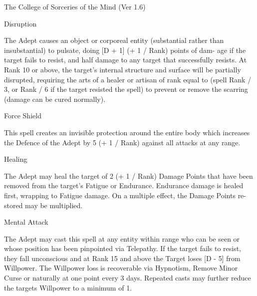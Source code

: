 \begin{Chapter}{The College of Sorceries of the Mind (Ver 1.6)}
\begin{spell}[S-1]{Disruption}

\begin{effects}
The Adept causes an object or corporeal entity (substantial rather
than insubstantial) to pulsate, doing [D + 1] (+ 1 / Rank) points of
dam- age if the target fails to resist, and half damage to any target
that successfully resists.  At Rank 10 or above, the target’s internal
structure and surface will be partially disrupted, requiring the arts
of a healer or artisan of rank equal to (spell Rank / 3, or Rank / 6
if the target resisted the spell) to prevent or remove the scarring
(damage can be cured normally).
\end{effects}
\end{spell}

\begin{spell}[S-2]{Force Shield}

\begin{effects}
This spell creates an invisible protection around the entire body
which increases the Defence of the Adept by 5 (+ 1 / Rank) against all
attacks at any range.
\end{effects}
\end{spell}

\begin{spell}[S-3]{Healing}

\begin{effects}
The Adept may heal the target of 2 (+ 1 / Rank) Damage Points that
have been removed from the target’s Fatigue or Endurance. Endurance
damage is healed first, wrapping to Fatigue damage.  On a multiple
effect, the Damage Points re- stored may be multiplied.
\end{effects}
\end{spell}

\begin{spell}[S-4]{Mental Attack}

\begin{effects}
The Adept may cast this spell at any entity within range who can be
seen or whose position has been pinpointed via Telepathy.  If the
target fails to resist, they fall unconscious and at Rank 15 and above
the Target loses [D - 5] from Willpower.  The Willpower loss is
recoverable via Hypnotism, Remove Minor Curse or naturally at one
point every 3 days.  Repeated casts may further reduce the targets
Willpower to a minimum of 1.
\end{effects}
\end{spell}


\end{Chapter}
